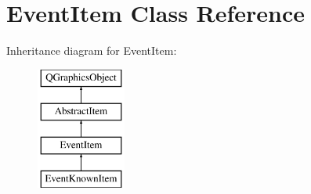 \hypertarget{class_event_item}{\section{Event\-Item Class Reference}
\label{class_event_item}
}
Inheritance diagram for Event\-Item\-:\begin{figure}[H]
\begin{center}
\leavevmode
\includegraphics[height=4.000000cm]{class_event_item}
\end{center}
\end{figure}
